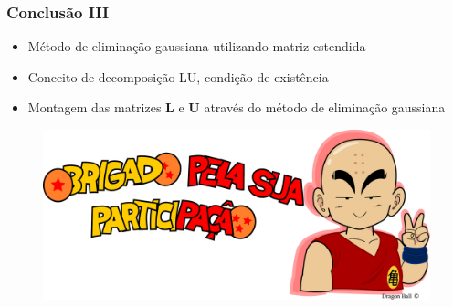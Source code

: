 \documentclass{beamer}
\theoremstyle{mystyle}
\begin{document}
\begin{frame}
	\frametitle{Conclusão III}	
	\begin{itemize}
		\item Método de eliminação gaussiana utilizando matriz estendida
		\item Conceito de decomposição LU, condição de existência
		\item Montagem das matrizes \textbf{L} e \textbf{U} através do método de eliminação gaussiana
	\end{itemize}
\end{frame}

\begin{frame}[plain]
\bigskip
\bigskip
\bigskip
\bigskip
\bigskip
\begin{figure}
	\centering
	\includegraphics[width=0.9\linewidth]{../krillin_v}
	\label{fig:luffyv}
\end{figure}
\end{frame}
\end{document}
